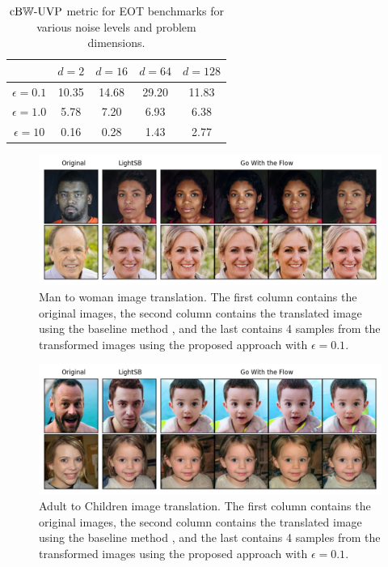 \documentclass[twoside]{article}
\begin{document}
\begin{table}
    \caption{ $\mathrm{cB}{\mathbb{W}}\mbox{-}\mathrm{UVP}$ metric for EOT benchmarks for various noise levels and problem dimensions.}
    \label{tab:benchmark}
    \centering
    \begin{tabular}{|c|c|c|c|c|}
\hline
                        & $d=2$ &$d=16$ &$d=64$ &$d=128$ \\
\hline
        $\epsilon=0.1$  &  10.35 & 14.68  & 29.20 & 11.83 \\
\hline
        $\epsilon=1.0$  &  5.78  & 7.20   & 6.93  & 6.38 \\
\hline
        $\epsilon=10$   &  0.16  & 0.28   & 1.43  & 2.77 \\
\hline
    \end{tabular}
\end{table}
%
\begin{figure}[!ht]
    \centering
    \includegraphics[width=1 \linewidth]{figures/M2F.png}
    \caption{Man to woman image translation. The first column contains the original images, the second column contains the translated image using the baseline method \cite{korotin2024light}, and the last contains 4 samples from the transformed images using the proposed approach with $\epsilon=0.1$.}
    \label{fig:M2F}
\end{figure}
%
\begin{figure}[!ht]
    \centering
    \includegraphics[width=1\linewidth]{figures/A2C.png}
    \caption{Adult to Children image translation. The first column contains the original images, the second column contains the translated image using the baseline method \cite{korotin2024light}, and the last contains 4 samples from the transformed images using the proposed approach with $\epsilon=0.1$.}
    \label{fig:A2C}
\end{figure}
%
\end{document}
